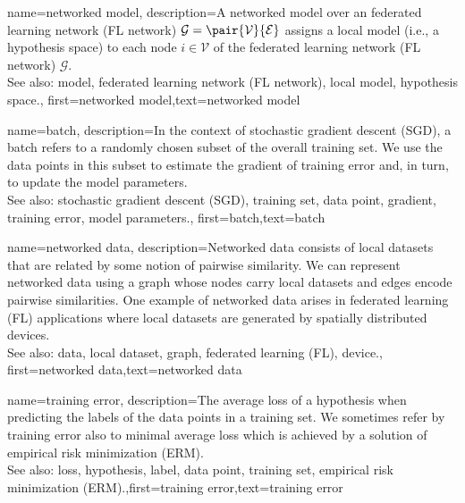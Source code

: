 {name={networked model},
  description={A networked model over an federated learning network (FL network) $\mathcal{G} = \pair{\mathcal{V}}{\mathcal{E}}$ assigns 
   a local model (i.e., a hypothesis space) to each node $i \in \mathcal{V}$ of the federated learning network (FL network) $\mathcal{G}$.
   		\\
		See also: model, federated learning network (FL network), local model, hypothesis space.}, 
   first={networked model},text={networked model}  
}

{
	name={batch},
	description={In the context of stochastic gradient descent (SGD), a batch refers to a randomly 
	chosen subset of the overall training set. We use the data points in this subset 
	to estimate the gradient of training error and, in turn, to update the model parameters.
			\\
		See also: stochastic gradient descent (SGD), training set, data point, gradient, training error, model parameters.}, 
	first={batch},text={batch}  
}

{
	name={networked data},
	description={Networked data consists of local datasets 
	that are related by some notion of pairwise similarity. We can represent networked 
	data using a graph whose nodes carry local datasets and edges encode 
	pairwise similarities. One example of networked data arises in federated learning (FL) applications 
	where local datasets are generated by spatially distributed devices.
			\\
		See also: data, local dataset, graph, federated learning (FL), device.}, 
	first={networked data},text={networked data}  
}

{
	name={training error},
	description={The average loss of a hypothesis when 
		predicting the labels of the data points in a training set. 
		We sometimes refer by training error also to minimal average loss 
		which is achieved by a solution of empirical risk minimization (ERM).
				\\
		See also: loss, hypothesis, label, data point, training set, empirical risk minimization (ERM).},first={training error},text={training error}  
}

